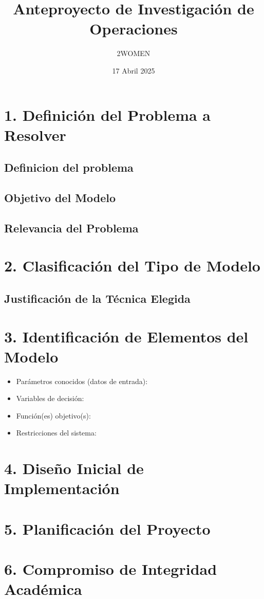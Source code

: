 \documentclass[12pt]{article}
\title{Anteproyecto de Investigación de Operaciones}
\author{2WOMEN}
\date{17 Abril 2025}
\begin{document}
\maketitle

\section*{1. Definición del Problema a Resolver}


\subsection*{Definicion del problema}

\subsection*{Objetivo del Modelo}

\subsection*{Relevancia del Problema}


\section*{2. Clasificación del Tipo de Modelo}


\subsection*{Justificación de la Técnica Elegida}


\section*{3. Identificación de Elementos del Modelo}


\begin{itemize}
    \item Parámetros conocidos (datos de entrada):
    \item Variables de decisión:
    \item Función(es) objetivo(s):
    \item Restricciones del sistema:
\end{itemize}


\section*{4. Diseño Inicial de Implementación}



\section*{5. Planificación del Proyecto}



\section*{6. Compromiso de Integridad Académica}
\end{document}
